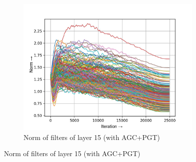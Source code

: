 \documentclass[times,sort&compress]{elsarticle}
\begin{document}
\begin{figure}[t]
\begin{subfigure}[t]{0.33\textwidth}
\includegraphics[width=\textwidth]{agc_pgt-w-layer-5-3}
\caption{Norm of filters of layer 15 (with AGC+PGT)}
\end{subfigure}


\end{figure}
\end{document}

